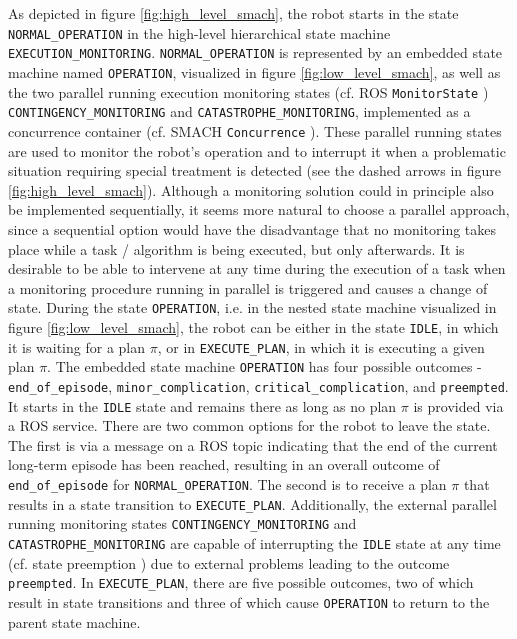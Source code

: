 \documentclass[english, master, utf8]{base/thesis_KBS}
\newcommand{\code}[1]{\colorbox{light-gray}{\texttt{#1}}}
\begin{document}
\noindent
As depicted in figure \ref{fig:high_level_smach}, the robot starts in the state \code{NORMAL\_OPERATION} in the high-level hierarchical state machine \code{EXECUTION\_MONITORING}.
\code{NORMAL\_OPERATION} is represented by an embedded state machine named \code{OPERATION}, visualized in figure \ref{fig:low_level_smach}, as well as the two
parallel running execution monitoring states (cf. ROS \code{MonitorState} \cite{monitor_state}) \code{CONTINGENCY\_MONITORING} and \code{CATASTROPHE\_MONITORING}, 
implemented as a concurrence container (cf. SMACH \code{Concurrence} \cite{concurrence_container}).
These parallel running states are used to monitor the robot's operation and to interrupt it when a problematic situation requiring special treatment is detected
(see the dashed arrows in figure \ref{fig:high_level_smach}).
Although a monitoring solution could in principle also be implemented sequentially, it seems more natural to choose a parallel approach, since a sequential option
would have the disadvantage that no monitoring takes place while a task / algorithm is being executed, but only afterwards.
It is desirable to be able to intervene at any time during the execution of a task when a monitoring procedure running in parallel is triggered and causes a change of state.
During the state \code{OPERATION}, i.e. in the nested state machine visualized in figure \ref{fig:low_level_smach}, the robot can be either in the state \code{IDLE}, 
in which it is waiting for a plan $\pi$, or in \code{EXECUTE\_PLAN}, in which it is executing a given plan $\pi$. The embedded state machine \code{OPERATION} has 
four possible outcomes - \code{end\_of\_episode}, \code{minor\_complication}, \code{critical\_complication}, and \code{preempted}. 
It starts in the \code{IDLE} state and remains there as long as no plan $\pi$ is provided via a ROS service.
There are two common options for the robot to leave the state. The first is via a message on a ROS topic indicating that the end of the current long-term episode
has been reached, resulting in an overall outcome of \code{end\_of\_episode} for \code{NORMAL\_OPERATION}. The second is to receive a plan $\pi$ that results in a state
transition to \code{EXECUTE\_PLAN}. Additionally, the external parallel running monitoring states \code{CONTINGENCY\_MONITORING} and \code{CATASTROPHE\_MONITORING}
are capable of interrupting the \code{IDLE} state at any time (cf. state preemption \cite{state_preemption}) due to external problems leading to the outcome \code{preempted}.
In \code{EXECUTE\_PLAN}, there are five possible outcomes, two of which result in state transitions and three of which cause \code{OPERATION} to return to the parent state machine.
\end{document}
